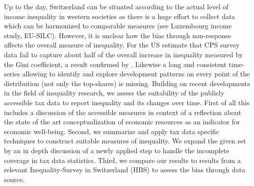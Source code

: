 \documentclass[twoside]{article}\usepackage[]{graphicx}\usepackage[]{color}
\begin{document}
\begin{multicols}{2}

Up to the day, Switzerland can be situated according to the actual level of income inequality in western societies as there is a huge effort to collect data which can be harmonized to comparable measures (see Luxembourg income study, EU-SILC). However, it is unclear how the bias through non-response affects the overall measure of inequality. For the US \citet{atkinson_top_2009} estimate that CPS survey data fail to capture about half of the overall increase in inequality measured by the Gini coefficient, a result confirmed by \citet{alvaredo_note_2011}. Likewise a long and consistent time-series allowing to identify and explore development patterns on every point of the distribution (not only the top-shares) is missing. Building on recent developments in the field of inequality research, we assess the suitability of the publicly accessible tax data to report inequality and its changes over time. First of all this includes a discussion of the accessible measures in context of a reflection about the state of the art conceptualization of economic resources as an indicator for economic well-being. Second, we summarize and apply tax data specific techniques to construct suitable measures of inequality. We expand the given set by an in depth discussion of a newly applied step to handle the incomplete coverage in tax data statistics. Third, we compare our results to results from a relevant Inequality-Survey in Switzerland (HBS) to assess the bias through data source.










\end{multicols}
\end{document}
